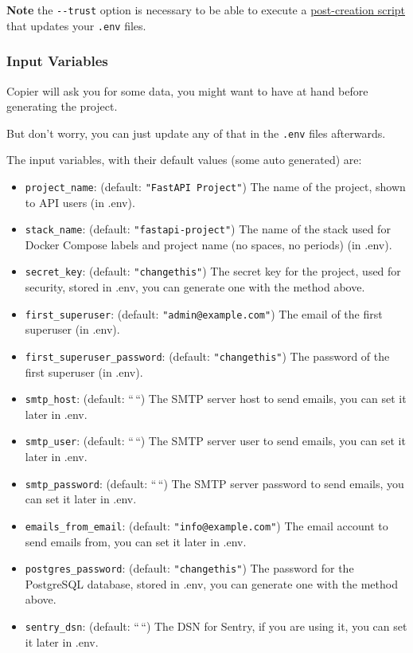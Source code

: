 \documentclass[
]{article}
\providecommand{\tightlist}{%
  \setlength{\itemsep}{0pt}\setlength{\parskip}{0pt}}
\begin{document}
\textbf{Note} the \texttt{-\/-trust} option is necessary to be able to
execute a
\href{https://github.com/tiangolo/full-stack-fastapi-template/blob/master/.copier/update_dotenv.py}{post-creation
script} that updates your \texttt{.env} files.

\hypertarget{input-variables}{%
\subsubsection{Input Variables}\label{input-variables}}

Copier will ask you for some data, you might want to have at hand before
generating the project.

But don't worry, you can just update any of that in the \texttt{.env}
files afterwards.

The input variables, with their default values (some auto generated)
are:

\begin{itemize}
\tightlist
\item
  \texttt{project\_name}: (default: \texttt{"FastAPI\ Project"}) The
  name of the project, shown to API users (in .env).
\item
  \texttt{stack\_name}: (default: \texttt{"fastapi-project"}) The name
  of the stack used for Docker Compose labels and project name (no
  spaces, no periods) (in .env).
\item
  \texttt{secret\_key}: (default: \texttt{"changethis"}) The secret key
  for the project, used for security, stored in .env, you can generate
  one with the method above.
\item
  \texttt{first\_superuser}: (default: \texttt{"admin@example.com"}) The
  email of the first superuser (in .env).
\item
  \texttt{first\_superuser\_password}: (default: \texttt{"changethis"})
  The password of the first superuser (in .env).
\item
  \texttt{smtp\_host}: (default: ``\,``) The SMTP server host to send
  emails, you can set it later in .env.
\item
  \texttt{smtp\_user}: (default: ``\,``) The SMTP server user to send
  emails, you can set it later in .env.
\item
  \texttt{smtp\_password}: (default: ``\,``) The SMTP server password to
  send emails, you can set it later in .env.
\item
  \texttt{emails\_from\_email}: (default: \texttt{"info@example.com"})
  The email account to send emails from, you can set it later in .env.
\item
  \texttt{postgres\_password}: (default: \texttt{"changethis"}) The
  password for the PostgreSQL database, stored in .env, you can generate
  one with the method above.
\item
  \texttt{sentry\_dsn}: (default: ``\,``) The DSN for Sentry, if you are
  using it, you can set it later in .env.
\end{itemize}
\end{document}
